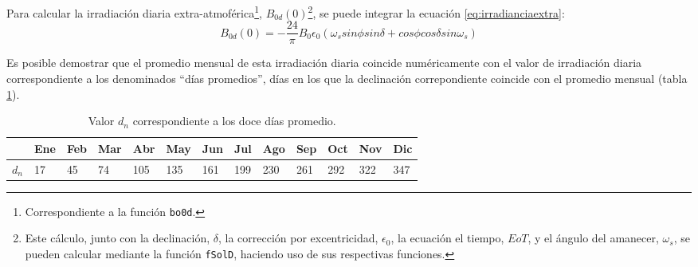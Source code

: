 Para calcular la irradiación diaria extra-atmoférica\footnote{Correspondiente a la función \texttt{bo0d}.}, \(B_{0d}(0)\)\footnote{Este cálculo, junto con la declinación, \(\delta\), la corrección por excentricidad, \(\epsilon_0\), la ecuación el tiempo, \(EoT\), y el ángulo del amanecer, \(\omega_s\), se pueden calcular mediante la función \texttt{fSolD}, haciendo uso de sus respectivas funciones.}, se puede integrar la ecuación \ref{eq:irradianciaextra}:
\begin{equation}
B_{0d}(0)=-\frac{24}{\pi}B_0\epsilon_0(\omega_s sin\phi sin\delta + cos\phi cos\delta sin \omega_s)
\label{eq:irradiacionextra}
\end{equation}

Es posible demostrar que el promedio mensual de esta irradiación diaria coincide numéricamente con el valor de irradiación diaria correspondiente a los denominados ``días promedios'', días en los que la declinación correpondiente coincide con el promedio mensual (tabla \ref{tab:DiasPromedio}).
\begin{center}
{\footnotesize }%
\begin{table}[h]
{\footnotesize \caption{Valor $d_{n}$ correspondiente a los doce días promedio.\label{tab:DiasPromedio}}
}{\footnotesize \par}

\centering{}{\footnotesize }\begin{tabular}{>{\centering}p{6mm}>{\centering}m{4mm}>{\centering}m{4mm}>{\centering}m{4mm}>{\centering}m{4mm}>{\centering}m{4mm}>{\centering}m{4mm}>{\centering}m{4mm}>{\centering}m{4mm}>{\centering}m{4mm}>{\centering}m{4mm}>{\centering}m{4mm}>{\centering}m{3mm}}
\toprule 
{\footnotesize Mes} & {\footnotesize Ene} & {\footnotesize Feb} & {\footnotesize Mar} & {\footnotesize Abr} & {\footnotesize May} & {\footnotesize Jun} & {\footnotesize Jul} & {\footnotesize Ago} & {\footnotesize Sep} & {\footnotesize Oct} & {\footnotesize Nov} & {\footnotesize Dic}\tabularnewline
\midrule
$d_{n}$ & {\footnotesize 17} & {\footnotesize 45} & {\footnotesize 74} & {\footnotesize 105} & {\footnotesize 135} & {\footnotesize 161} & {\footnotesize 199} & {\footnotesize 230} & {\footnotesize 261} & {\footnotesize 292} & {\footnotesize 322} & {\footnotesize 347}\tabularnewline
\bottomrule
\end{tabular}
\end{table}
\par\end{center}{\footnotesize \par}

